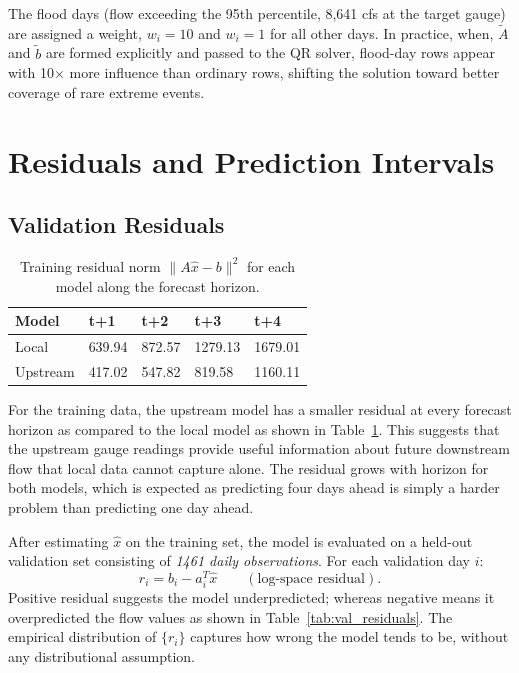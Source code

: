 \documentclass[10pt, twocolumn]{article}
\begin{document}
The flood days (flow exceeding the 95th percentile, 8,641 cfs at the target gauge) are assigned a weight, $w_i = 10$ and $w_i = 1$ for all other days. In practice, when, $\tilde{A}$ and $\tilde{b}$ are formed explicitly and passed to the QR solver, flood-day rows appear with 10$\times$ more influence than ordinary rows, shifting the solution toward better coverage of rare extreme events.
\section{Residuals and Prediction Intervals}

\subsection{Validation Residuals}

\begin{table}[h]
\centering
\caption{Training residual norm $\|A\hat{x} - b\|^2$ for each model along the forecast horizon.}
\label{tab:residuals}
\footnotesize
\begin{tabularx}{\columnwidth}{@{}lXXXX@{}}
\toprule
\textbf{Model} & \textbf{t+1} & \textbf{t+2} & \textbf{t+3} & \textbf{t+4} \\
\midrule
Local    & 639.94 & 872.57 & 1279.13 & 1679.01 \\
Upstream & 417.02 & 547.82 &  819.58 & 1160.11 \\
\bottomrule
\end{tabularx}
\end{table}


For the training data, the upstream model has a smaller residual at every forecast horizon as compared to the local model as shown in Table~\ref{tab:residuals}. This suggests that the upstream gauge readings provide useful information about future downstream flow that local data cannot capture alone. The residual grows with horizon for both models, which is expected as predicting four days ahead is simply a harder problem than predicting one day ahead.

After estimating $\hat{x}$ on the training set, the model is evaluated on a held-out validation set consisting of \emph{1461 daily observations}. For each validation day \(i\):
\[
  r_i = b_i - a_i^T \hat{x} \qquad (\text{log-space residual}).
\]
Positive residual suggests the model underpredicted; whereas negative means it overpredicted the flow values as shown in Table~\ref{tab:val_residuals}.
The empirical distribution of $\{r_i\}$ captures how wrong the model tends to be, without any distributional assumption.
\end{document}
